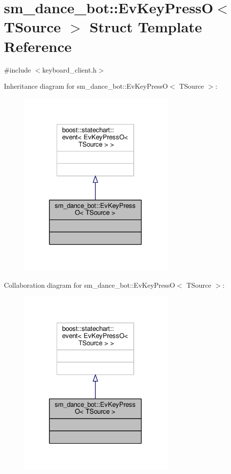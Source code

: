 \hypertarget{structsm__dance__bot_1_1EvKeyPressO}{}\section{sm\+\_\+dance\+\_\+bot\+:\+:Ev\+Key\+PressO$<$ T\+Source $>$ Struct Template Reference}
\label{structsm__dance__bot_1_1EvKeyPressO}


{\ttfamily \#include $<$keyboard\+\_\+client.\+h$>$}



Inheritance diagram for sm\+\_\+dance\+\_\+bot\+:\+:Ev\+Key\+PressO$<$ T\+Source $>$\+:
\nopagebreak
\begin{figure}[H]
\begin{center}
\leavevmode
\includegraphics[width=221pt]{structsm__dance__bot_1_1EvKeyPressO__inherit__graph}
\end{center}
\end{figure}


Collaboration diagram for sm\+\_\+dance\+\_\+bot\+:\+:Ev\+Key\+PressO$<$ T\+Source $>$\+:
\nopagebreak
\begin{figure}[H]
\begin{center}
\leavevmode
\includegraphics[width=221pt]{structsm__dance__bot_1_1EvKeyPressO__coll__graph}
\end{center}
\end{figure}


